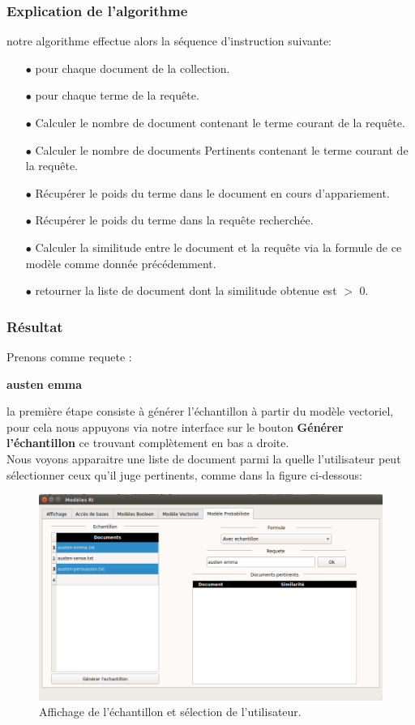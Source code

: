 \documentclass[12pt,a4paper,oneside]{article}
\begin{document}
\subsubsection*{Explication de l'algorithme}
notre algorithme effectue alors la séquence d'instruction suivante:
\begin{itemize}
	\item[$\bullet$] pour chaque document de la collection.
	\item[$\bullet$] pour chaque terme de la requête.
	\item[$\bullet$] Calculer le nombre de document contenant le terme courant de la requête.
	\item[$\bullet$] Calculer le nombre de documents Pertinents contenant le terme courant de la requête.
	\item[$\bullet$] Récupérer le poids du terme dans le document en cours d'appariement.
	\item[$\bullet$] Récupérer le poids du terme dans la requête recherchée.
	\item[$\bullet$] Calculer la similitude entre le document et la requête via la formule de ce modèle comme donnée précédemment.
	\item[$\bullet$] retourner la liste de document dont la similitude obtenue est $>$ 0.
	
\end{itemize}

\subsubsection*{Résultat}
Prenons comme requete : 
\begin{center}
	\textbf{austen emma}
\end{center}
la première étape consiste à générer l'échantillon à partir du modèle vectoriel, pour cela nous appuyons via notre interface sur le bouton \textbf{Générer l'échantillon} ce trouvant complètement en bas a droite.\\

Nous voyons apparaitre une liste de document parmi la quelle l'utilisateur peut sélectionner ceux qu'il juge pertinents, comme dans la figure ci-dessous:
	\begin{figure}[H]
		\centering
		\includegraphics[scale=0.4]{images/modeleP.png}
		\caption{Affichage de l'échantillon et sélection de l'utilisateur.}
	\end{figure}
	
\end{document}
